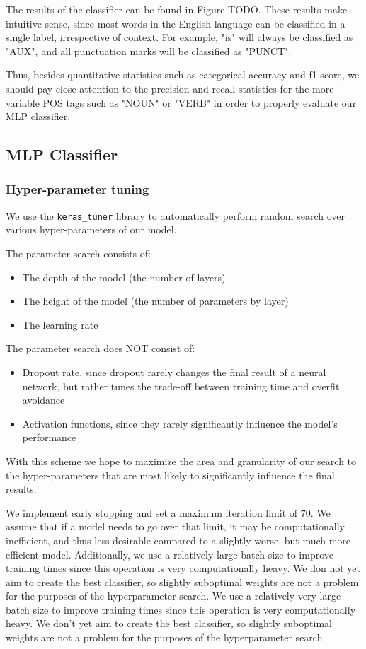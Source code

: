\documentclass[10pt, a4paper]{article}
\begin{document}
	The results of the classifier can be found in Figure TODO. These results make intuitive sense, since most words in the English language can be classified in a single label, irrespective of context. For example, "is" will always be classified as "AUX", and all punctuation marks will be classified as "PUNCT".
	
	Thus, besides quantitative statistics such as categorical accuracy and f1-score, we should pay close attention to the precision and recall statistics for the more variable POS tags such as "NOUN" or "VERB" in order to properly evaluate our MLP classifier.
	

	\subsection{MLP Classifier}
	
	\subsubsection{Hyper-parameter tuning}
	
	We use the \texttt{keras\_tuner} library to automatically perform random search over various hyper-parameters of our model.
	
	The parameter search consists of:
	\begin{itemize}
		\item The depth of the model (the number of layers)
		\item The height of the model (the number of parameters by layer) 
		\item The learning rate
	\end{itemize}

	
	The parameter search does NOT consist of:
	\begin{itemize}
		\item Dropout rate, since dropout rarely changes the final result of a neural network, but rather tunes the trade-off between training time and overfit avoidance
		\item Activation functions, since they rarely significantly influence the model's performance
	\end{itemize}
	
	With this scheme we hope to maximize the area and granularity of our search to the hyper-parameters that are most likely to significantly influence the final results.
	
	We implement early stopping and set a maximum iteration limit of $70$. We assume that if a model needs to go over that limit, it may be computationally inefficient, and thus less desirable compared to a slightly worse, but much more efficient model. Additionally, we use a relatively large batch size to improve training times since this operation is very computationally heavy. We don not yet aim to create the best classifier, so slightly suboptimal weights are not a problem for the purposes of the hyperparameter search.
	We use a relatively very large batch size to improve training times since this operation is very computationally heavy. We don't yet aim to create the best classifier, so slightly suboptimal weights are not a problem for the purposes of the hyperparameter search.
	
\end{document}

